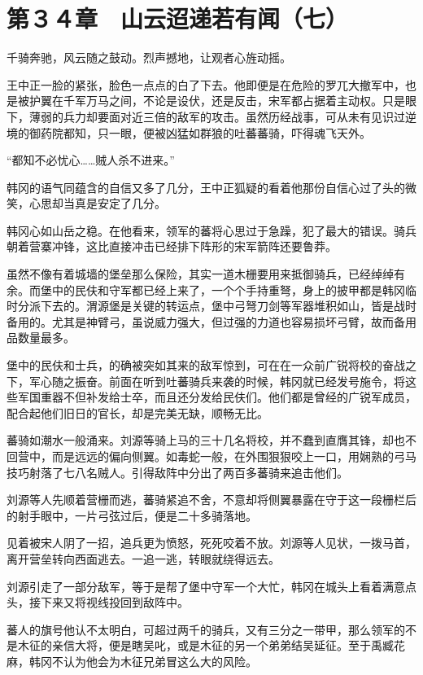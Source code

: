 \section{第３４章　山云迢递若有闻（七）}

千骑奔驰，风云随之鼓动。烈声撼地，让观者心旌动摇。

王中正一脸的紧张，脸色一点点的白了下去。他即便是在危险的罗兀大撤军中，也是被护翼在千军万马之间，不论是设伏，还是反击，宋军都占据着主动权。只是眼下，薄弱的兵力却要面对近三倍的敌军的攻击。虽然历经战事，可从未有见识过逆境的御药院都知，只一眼，便被凶猛如群狼的吐蕃蕃骑，吓得魂飞天外。

“都知不必忧心……贼人杀不进来。”

韩冈的语气同蕴含的自信又多了几分，王中正狐疑的看着他那份自信心过了头的微笑，心思却当真是安定了几分。

韩冈心如山岳之稳。在他看来，领军的蕃将心思过于急躁，犯了最大的错误。骑兵朝着营寨冲锋，这比直接冲击已经排下阵形的宋军箭阵还要鲁莽。

虽然不像有着城墙的堡垒那么保险，其实一道木栅要用来抵御骑兵，已经绰绰有余。而堡中的民伕和守军都已经上来了，一个个手持重弩，身上的披甲都是韩冈临时分派下去的。渭源堡是关键的转运点，堡中弓弩刀剑等军器堆积如山，皆是战时备用的。尤其是神臂弓，虽说威力强大，但过强的力道也容易损坏弓臂，故而备用品数量最多。

堡中的民伕和士兵，的确被突如其来的敌军惊到，可在在一众前广锐将校的奋战之下，军心随之振奋。前面在听到吐蕃骑兵来袭的时候，韩冈就已经发号施令，将这些军国重器不但补发给士卒，而且还分发给民伕们。他们都是曾经的广锐军成员，配合起他们旧日的官长，却是完美无缺，顺畅无比。

蕃骑如潮水一般涌来。刘源等骑上马的三十几名将校，并不蠢到直膺其锋，却也不回营中，而是远远的偏向侧翼。如毒蛇一般，在外围狠狠咬上一口，用娴熟的弓马技巧射落了七八名贼人。引得敌阵中分出了两百多蕃骑来追击他们。

刘源等人先顺着营栅而逃，蕃骑紧追不舍，不意却将侧翼暴露在守于这一段栅栏后的射手眼中，一片弓弦过后，便是二十多骑落地。

见着被宋人阴了一招，追兵更为愤怒，死死咬着不放。刘源等人见状，一拨马首，离开营垒转向西面逃去。一追一逃，转眼就绕得远去。

刘源引走了一部分敌军，等于是帮了堡中守军一个大忙，韩冈在城头上看着满意点头，接下来又将视线投回到敌阵中。

蕃人的旗号他认不太明白，可超过两千的骑兵，又有三分之一带甲，那么领军的不是木征的亲信大将，便是瞎吴叱，或是木征的另一个弟弟结吴延征。至于禹臧花麻，韩冈不认为他会为木征兄弟冒这么大的风险。

